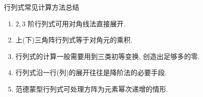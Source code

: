 \begin{frame}{行列式常见计算方法总结}
	\onslide<+->
	\begin{enumerate}
		\item $2,3$ 阶行列式可用对角线法直接展开.
		\item 上(下)三角阵行列式等于对角元的乘积.
		\item 行列式的计算一般需要用到\alert{三类初等变换}, 创造出足够多的零.
		\item 行列式沿一行(列)的展开往往是\alert{降阶法}的必要手段.
		\item 范德蒙型行列式可处理方阵为元素幂次递增的情形.
	\end{enumerate}
\end{frame}
